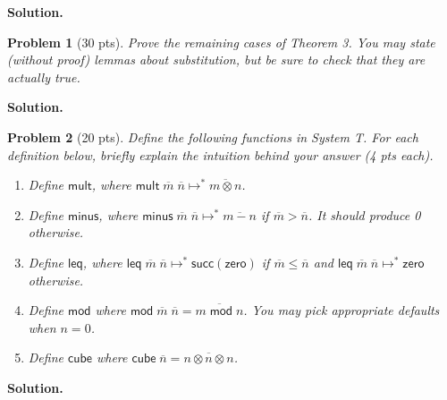 \documentclass{article}
\newcommand{\m}[1]{\mathsf{#1}}
\newcommand{\step}{\mapsto}
\newcommand{\num}[1]{\overline{#1}}
\newcommand{\mstep}{\step^{*}}
\newcommand{\zero}{\m{zero}}
\renewcommand{\succ}[1]{\m{succ}(#1)}
\newtheorem{problem}{Problem}
\newenvironment{solution}{\textbf{Solution.}}{}
\begin{document}
\begin{solution}
  
\end{solution}


\begin{problem}[30 pts]
  Prove the remaining cases of Theorem 3.
  You may state (without proof) lemmas about substitution, but be sure
  to check that they are actually true.
\end{problem}

\begin{solution}
  
\end{solution}


\begin{problem}[20 pts]
    Define the following functions in System T. For each definition below,
    briefly explain the intuition behind your answer (4 pts each).

    \begin{enumerate}
        \item Define $\m{mult}$, where $\m{mult} \; \num{m} \; \num{n} \mstep \num{m \otimes n}$.
        \item Define $\m{minus}$, where $\m{minus} \; \num{m} \; \num{n} \mstep \num{m - n}$ if $\num{m} > \num{n}$. It should produce 0 otherwise.
        \item Define $\m{leq}$, where $\m{leq} \; \num{m} \; \num{n} \mstep \succ{\zero}$ if $\num{m} \leq \num{n}$ and
        $\m{leq} \; \num{m} \; \num{n} \mstep \zero$ otherwise.
        \item Define $\m{mod}$ where $\m{mod} \; \num{m} \; \num{n} = \num{m \; \m{mod} \; n}$. You may pick appropriate defaults when $n = 0$.
        \item Define $\m{cube}$ where $\m{cube} \; \num{n} = \num{n \otimes n \otimes n}$.
    \end{enumerate}

\end{problem}

\begin{solution}
  
\end{solution}
\end{document}
